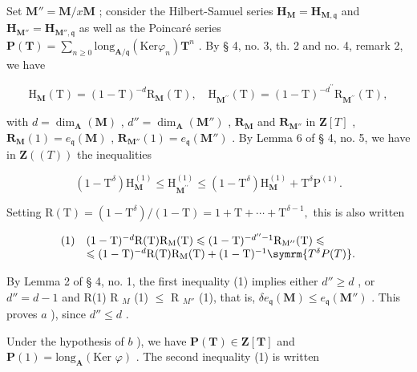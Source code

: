 Set \(\mathbf{M}'' = \mathbf{M} / x\mathbf{M}\) ; consider the Hilbert-Samuel series \(\mathbf{H}_{\mathbf{M}} = \mathbf{H}_{\mathbf{M},\mathfrak{q}}\) and \(\mathbf{H}_{\mathbf{M}''} = \mathbf{H}_{\mathbf{M}'',\mathfrak{q}}\) as well as the Poincaré series \(\mathbf{P}(\mathbf{T}) = \sum_{n\geqslant 0}\mathrm{long}_{\mathbf{A} / \mathfrak{q}}(\mathrm{Ker}\varphi_n)\mathbf{T}^n\) . By § 4, no. 3, th. 2 and no. 4, remark 2, we have

\[
\mathrm{H} _ {\mathbf {M}} (\mathrm{T}) = (1 - \mathrm{T}) ^ {- d} \mathrm{R} _ {\mathbf {M}} (\mathrm{T}), \quad \mathrm{H} _ {\mathbf {M} ^ {\prime \prime}} (\mathrm{T}) = (1 - \mathrm{T}) ^ {- d ^ {\prime \prime}} \mathrm{R} _ {\mathbf {M} ^ {\prime \prime}} (\mathrm{T}),
\]

with \(d = \dim_{\mathbf{A}}(\mathbf{M})\) , \(d'' = \dim_{\mathbf{A}}(\mathbf{M}'')\) , \(\mathbf{R}_{\mathbf{M}}\) and \(\mathbf{R}_{\mathbf{M}''}\) in \(\mathbf{Z}[T]\) , \(\mathbf{R}_{\mathbf{M}}(1) = e_{\mathfrak{q}}(\mathbf{M})\) , \(\mathbf{R}_{\mathbf{M}''}(1) = e_{\mathfrak{q}}(\mathbf{M}'')\) . By Lemma 6 of § 4, no. 5, we have in \(\mathbf{Z}((T))\) the inequalities

\[
\left(1 - \mathrm{T} ^ {\delta}\right) \mathrm{H} _ {\mathbf {M}} ^ {(1)} \leqslant \mathrm{H} _ {\mathbf {M} ^ {\prime \prime}} ^ {(1)} \leqslant \left(1 - \mathrm{T} ^ {\delta}\right) \mathrm{H} _ {\mathbf {M}} ^ {(1)} + \mathrm{T} ^ {\delta} \mathrm{P} ^ {(1)}.
\]

Setting \(\mathrm{R}(\mathrm{T}) = (1 - \mathrm{T}^{\delta}) / (1 - \mathrm{T}) = 1 + \mathrm{T} + \cdots + \mathrm{T}^{\delta-1},\) this is also written

\[
\begin{array}{r l} (1) & (1 - \mathrm{T}) ^ {- d} \mathrm{R(T)} \mathrm {R_ {M} (T)} \leqslant (1 - \mathrm{T}) ^ {- d ^ {\prime \prime} - 1} \mathrm {R_ {M^ {\prime\prime}} (T)} \leqslant \\ & \leqslant (1 - \mathrm{T}) ^ {- d} \mathrm{R(T)} \mathrm {R_ {M} (T)} + (1 - \mathrm{T}) ^ {- 1} \symrm {T^ {\delta} P(T)}. \end{array}
\]

By Lemma 2 of § 4, no. 1, the first inequality (1) implies either \(d'' \geqslant d\) , or \(d'' = d - 1\) and R(1) R \(_{M}\) (1) \(\leqslant\) R \(_{M''}\) (1), that is, \(\delta e_{\mathfrak{q}}(\mathbf{M}) \leqslant e_{\mathfrak{q}}(\mathbf{M}'')\) . This proves \(a\) ), since \(d'' \leqslant d\) .

Under the hypothesis of \(b\) ), we have \(\mathbf{P}(\mathbf{T}) \in \mathbf{Z}[\mathbf{T}]\) and \(\mathbf{P}(1) = \text{long}_{\mathbf{A}}(\text{Ker } \varphi)\) . The second inequality (1) is written


